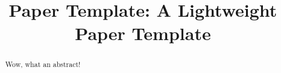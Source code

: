 \documentclass[conference,10pt,letterpaper]{IEEEtran}
\begin{document}
\title{Paper Template: A Lightweight Paper Template}

\author{
}

\maketitle

\begin{abstract}
    Wow, what an abstract!
\end{abstract}



\balance



\end{document}
